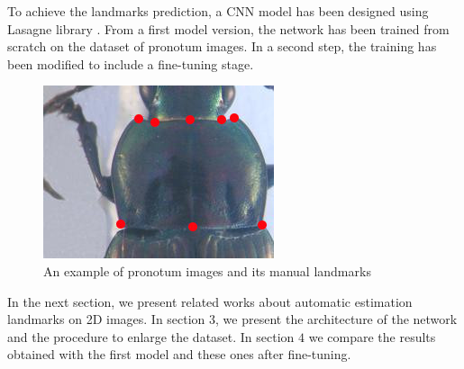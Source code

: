 \documentclass[10pt]{article}
\begin{document}
To achieve the landmarks prediction, a CNN model \cite{lecun2010convolutional} has been designed using Lasagne
library \cite{lasagne}. From a first model version, the network has been
trained from scratch on the dataset of pronotum images. In a second
step, the training has been modified to include a fine-tuning
\cite{yosinski2014transferable} stage.



\begin{figure}[htbp]
\centering
	\centerline{\includegraphics[scale=0.8]{images/pronotum}}
	\caption{\small{An example of pronotum images and its manual landmarks}}
	\label{figpronotum}
\end{figure}

In the next section, we present related works about automatic
estimation landmarks on 2D images. In section $3$, we present the
architecture of the network and the procedure to enlarge the dataset. In section $4$ we compare the results obtained with the first
model and these ones after fine-tuning. 
\end{document}
